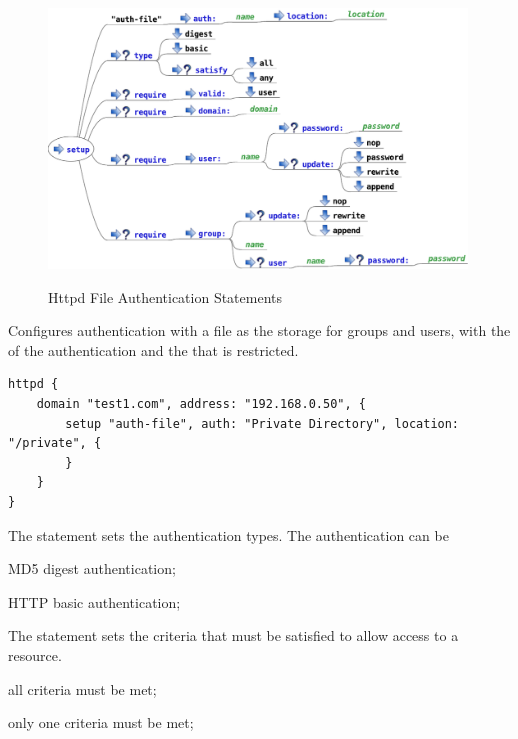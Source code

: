 \begin{figure}[htp]
\centering
\includegraphics[width=0.99\textwidth]{httpd_setup_auth_file_script}
\label{fig:httpd_setup_auth_file_script}
\caption{Httpd File Authentication Statements}
\end{figure}


Configures authentication with a file as the storage for groups and users,
with the  of the authentication and the  that is 
restricted.

\begin{lstlisting}[style=Java]
httpd {
    domain "test1.com", address: "192.168.0.50", {
        setup "auth-file", auth: "Private Directory", location: "/private", {
        }
    }
}
\end{lstlisting}


The  statement sets the authentication types. The 
authentication can be 
\begin{asparaitem}
\item {} MD5 digest authentication;
\item {} HTTP basic authentication;
\end{asparaitem}

The  statement sets the criteria that must be satisfied to 
allow access to a resource.
\begin{asparaitem}
\item {} all criteria must be met;
\item {} only one criteria must be met;
\end{asparaitem}

